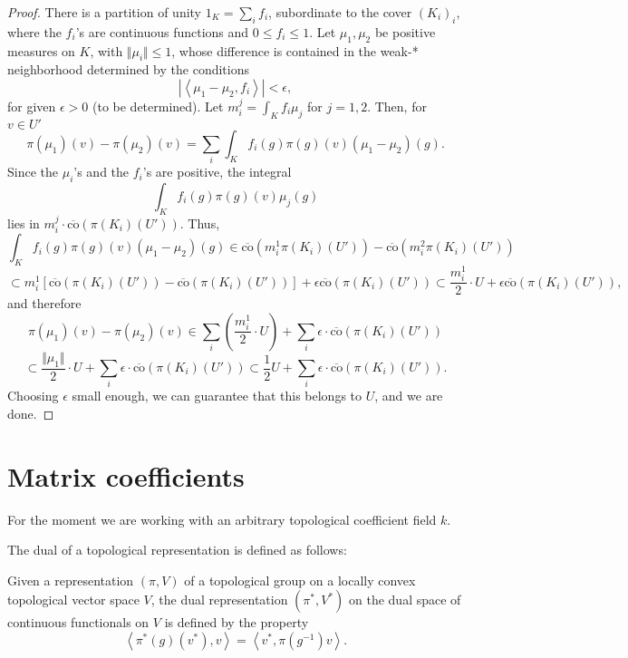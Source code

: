 \begin{proof}
There is a partition of unity $1_K=\sum_i f_i$, subordinate to the cover $(K_i)_i$, where the $f_i$'s are continuous functions and $0\le f_i\le 1$. 
Let $\mu_1, \mu_2$ be positive measures on $K$, with $\Vert \mu_i\Vert\le 1$, whose difference is contained in the weak-* neighborhood determined by the conditions
$$ |\left < \mu_1-\mu_2, f_i \right>| <\epsilon,$$
for given $\epsilon >0$ (to be determined). Let $m_i^j = \int_K f_i \mu_j$ for $j=1,2$.
Then, for $v\in U'$
$$ \pi(\mu_1)(v) - \pi(\mu_2) (v) = \sum_i \int_K f_i(g) \pi(g)(v) (\mu_1-\mu_2)(g).$$
Since the $\mu_i$'s and the $f_i$'s are positive, the integral 
$$ \int_K f_i(g) \pi(g)(v) \mu_j(g)$$
lies in $m_i^j \cdot \overline{\text{co}}(\pi(K_i)(U'))$. Thus, 
$$\int_K f_i(g) \pi(g)(v) (\mu_1-\mu_2)(g) \in \overline{\text{co}}\left(m_i^1 \pi(K_i)(U')\right) - \overline{\text{co}}\left(m_i^2 \pi(K_i)(U')\right)$$ 
$$\subset  m_i^1 \left[\overline{\text{co}}\left(\pi(K_i)(U')\right) - \overline{\text{co}}\left(\pi(K_i)(U')\right) \right] + \epsilon \overline{\text{co}}\left(\pi(K_i)(U')\right)  \subset \frac{m_i^1}{2} \cdot U + \epsilon \overline{\text{co}}\left(\pi(K_i)(U')\right),$$
and therefore 
$$ \pi(\mu_1)(v) - \pi(\mu_2) (v) \in \sum_i (\frac{m_i^1}{2} \cdot U) + \sum_i \epsilon \cdot \overline{\text{co}}\left(\pi(K_i)(U')\right)$$
$$\subset \frac{\Vert \mu_1\Vert}{2} \cdot U + \sum_i \epsilon \cdot \overline{\text{co}}\left(\pi(K_i)(U')\right) \subset \frac{1}{2} U + \sum_i \epsilon \cdot \overline{\text{co}}\left(\pi(K_i)(U')\right).$$
Choosing $\epsilon$ small enough, we can guarantee that this belongs to $U$, and we are done. 

\end{proof}






\section{Matrix coefficients} 
\label{section-matrixcoefficients}

For the moment we are working with an arbitrary topological coefficient field $k$.

The dual of a topological representation is defined as follows:
\begin{definition}
\label{definition-dual-representation}
Given a representation $(\pi, V)$ of a topological group on a locally convex topological vector space $V$, the dual representation $(\pi^*,V^*)$ on the dual space of continuous functionals on $V$ is defined by the property
 $$ \left < \pi^*(g)(v^*), v\right> = \left < v^*, \pi(g^{-1}) v\right>.$$
\end{definition}

